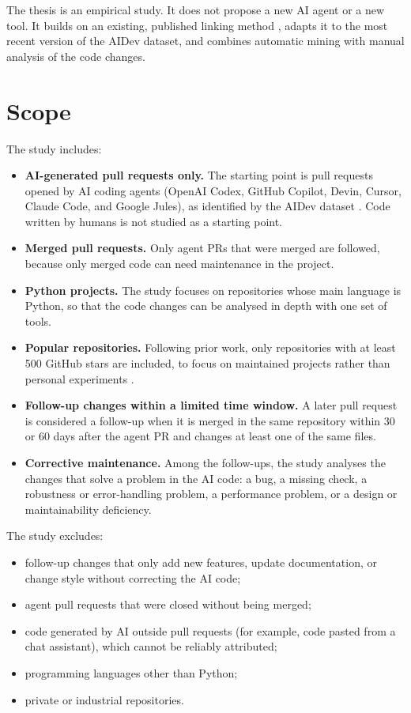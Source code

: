 The thesis is an empirical study. It does not propose a new AI agent or a new
tool. It builds on an existing, published linking method
\cite{takerngsaksiri2026finishes}, adapts it to the most recent version of the
AIDev dataset, and combines automatic mining with manual analysis of the code
changes.

\section{Scope}
\label{sec:scope}

The study includes:

\begin{itemize}
  \item \textbf{AI-generated pull requests only.} The starting point is pull
  requests opened by AI coding agents (OpenAI Codex, GitHub Copilot, Devin,
  Cursor, Claude Code, and Google Jules), as identified by the AIDev dataset
  \cite{li2026aidev}. Code written by humans is not studied as a starting point.
  \item \textbf{Merged pull requests.} Only agent PRs that were merged are
  followed, because only merged code can need maintenance in the project.
  \item \textbf{Python projects.} The study focuses on repositories whose main
  language is Python, so that the code changes can be analysed in depth with one
  set of tools.
  \item \textbf{Popular repositories.} Following prior work, only repositories
  with at least 500 GitHub stars are included, to focus on maintained projects
  rather than personal experiments \cite{takerngsaksiri2026finishes}.
  \item \textbf{Follow-up changes within a limited time window.} A later pull
  request is considered a follow-up when it is merged in the same repository
  within 30 or 60 days after the agent PR and changes at least one of the same
  files.
  \item \textbf{Corrective maintenance.} Among the follow-ups, the study analyses
  the changes that solve a problem in the AI code: a bug, a missing check, a
  robustness or error-handling problem, a performance problem, or a design or
  maintainability deficiency.
\end{itemize}

The study excludes:

\begin{itemize}
  \item follow-up changes that only add new features, update documentation, or
  change style without correcting the AI code;
  \item agent pull requests that were closed without being merged;
  \item code generated by AI outside pull requests (for example, code pasted from
  a chat assistant), which cannot be reliably attributed;
  \item programming languages other than Python;
  \item private or industrial repositories.
\end{itemize}


